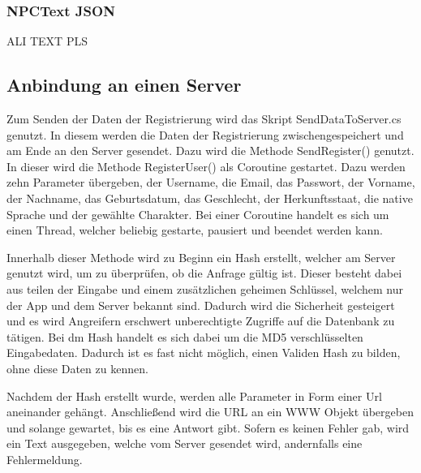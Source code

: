\label{npctext}
\subsubsection{NPCText JSON}
ALI TEXT PLS 

\subsection{Anbindung an einen Server}
Zum Senden der Daten der Registrierung wird das Skript SendDataToServer.cs genutzt. In diesem werden die Daten der Registrierung zwischengespeichert und am Ende an den Server gesendet. Dazu wird die Methode SendRegister() genutzt. In dieser wird die Methode RegisterUser() als Coroutine gestartet. Dazu werden zehn Parameter übergeben, der Username, die Email, das Passwort, der Vorname, der Nachname, das Geburtsdatum, das Geschlecht, der Herkunftsstaat, die native Sprache und der gewählte Charakter. Bei einer Coroutine handelt es sich um einen Thread, welcher beliebig gestarte, pausiert und beendet werden kann.
	
Innerhalb dieser Methode wird zu Beginn ein Hash erstellt, welcher am Server genutzt wird, um zu überprüfen, ob die Anfrage gültig ist. Dieser besteht dabei aus teilen der Eingabe und einem zusätzlichen geheimen Schlüssel, welchem nur der App und dem Server bekannt sind. Dadurch wird die Sicherheit gesteigert und es wird Angreifern erschwert unberechtigte Zugriffe auf die Datenbank zu tätigen. Bei dm Hash handelt es sich dabei um die MD5 verschlüsselten Eingabedaten. Dadurch ist es fast nicht möglich, einen Validen Hash zu bilden, ohne diese Daten zu kennen.
	
Nachdem der Hash erstellt wurde, werden alle Parameter in Form einer Url aneinander gehängt. Anschließend wird die URL an ein WWW Objekt übergeben und solange gewartet, bis es eine Antwort gibt. Sofern es keinen Fehler gab, wird ein Text ausgegeben, welche vom Server gesendet wird, andernfalls eine Fehlermeldung.

